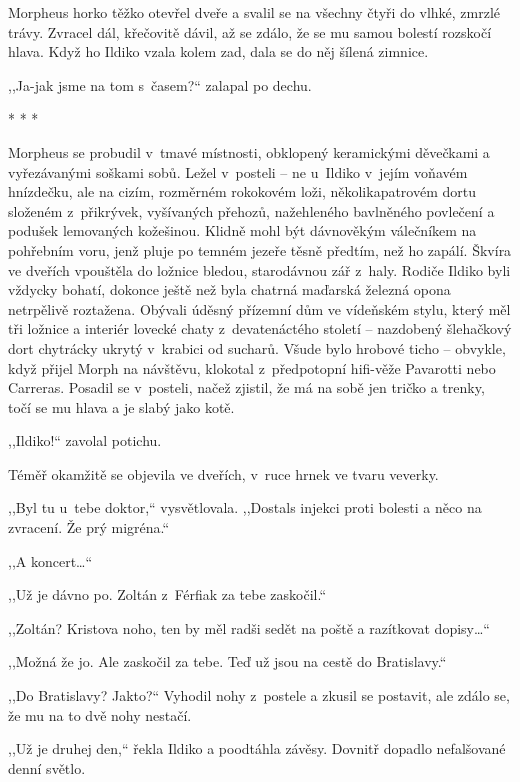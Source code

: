 Morpheus horko těžko otevřel dveře a svalil se na všechny čtyři do vlhké, zmrzlé trávy. Zvracel dál, křečovitě dávil, až se zdálo, že se mu samou bolestí rozskočí hlava. Když ho Ildiko vzala kolem zad, dala se do něj šílená zimnice.

,,Ja-jak jsme na tom s časem?`` zalapal po dechu.

\begin{center}
* * *
\end{center}

Morpheus se probudil v tmavé místnosti, obklopený keramickými děvečkami a vyřezávanými soškami sobů. Ležel v posteli -- ne u~Ildiko v jejím voňavém hnízdečku, ale na cizím, rozměrném rokokovém loži, několikapatrovém dortu složeném z přikrývek, vyšívaných přehozů, nažehleného bavlněného povlečení a podušek lemovaných kožešinou. Klidně mohl být dávnověkým válečníkem na pohřebním voru, jenž pluje po temném jezeře těsně předtím, než ho zapálí.
Škvíra ve dveřích vpouštěla do ložnice bledou, starodávnou zář z haly. Rodiče Ildiko byli vždycky bohatí, dokonce ještě než byla chatrná maďarská železná opona netrpělivě roztažena. Obývali úděsný přízemní dům ve vídeňském stylu, který měl tři ložnice a interiér lovecké chaty z devatenáctého století -- nazdobený šlehačkový dort chytrácky ukrytý v krabici od sucharů.
Všude bylo hrobové ticho -- obvykle, když přijel Morph na návštěvu, klokotal z předpotopní hifi-věže Pavarotti nebo Carreras. Posadil se v posteli, načež zjistil, že má na sobě jen tričko a trenky, točí se mu hlava a je slabý jako kotě.

,,Ildiko!`` zavolal potichu.

Téměř okamžitě se objevila ve dveřích, v ruce hrnek ve tvaru veverky.

,,Byl tu u~tebe doktor,`` vysvětlovala. ,,Dostals injekci proti bolesti a něco na zvracení. Že prý migréna.``

,,A koncert\ldots``

,,Už je dávno po. Zoltán z Férfiak za tebe zaskočil.``

,,Zoltán? Kristova noho, ten by měl radši sedět na poště a razítkovat dopisy\ldots``

,,Možná že jo. Ale zaskočil za tebe. Teď už jsou na cestě do Bratislavy.``

,,Do Bratislavy? Jakto?`` Vyhodil nohy z postele a zkusil se postavit, ale zdálo se, že mu na to dvě nohy nestačí.

,,Už je druhej den,`` řekla Ildiko a poodtáhla závěsy. Dovnitř dopadlo nefalšované denní světlo.

